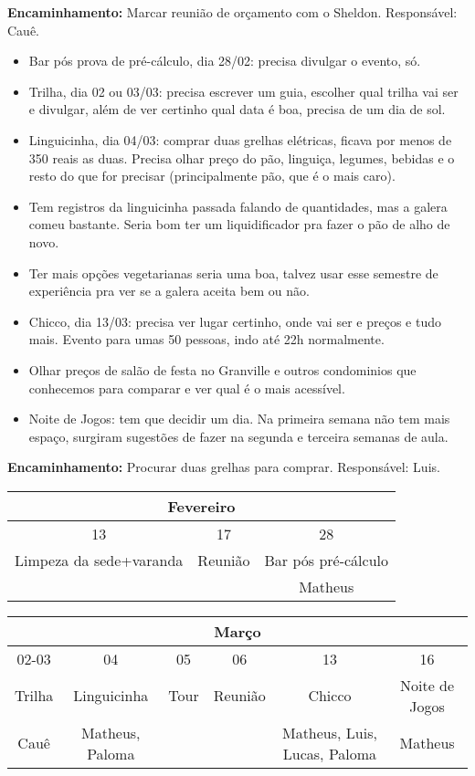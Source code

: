 \documentclass{ata-calico}
\begin{document}
\textbf{Encaminhamento:} Marcar reunião de orçamento com o Sheldon. Responsável: Cauê.

\begin{itemize}
\item Bar pós prova de pré-cálculo, dia 28/02: precisa divulgar o evento, só.
\item Trilha, dia 02 ou 03/03: precisa escrever um guia, escolher qual trilha vai ser e divulgar, além de ver certinho qual data é boa, precisa de um dia de sol.
\item Linguicinha, dia 04/03: comprar duas grelhas elétricas, ficava por menos de 350 reais as duas. Precisa olhar preço do pão, linguiça, legumes, bebidas e o resto do que for precisar (principalmente pão, que é o mais caro).
\item Tem registros da linguicinha passada falando de quantidades, mas a galera comeu bastante. Seria bom ter um liquidificador pra fazer o pão de alho de novo.
\item Ter mais opções vegetarianas seria uma boa, talvez usar esse semestre de experiência pra ver se a galera aceita bem ou não.
\item Chicco, dia 13/03: precisa ver lugar certinho, onde vai ser e preços e tudo mais. Evento para umas 50 pessoas, indo até 22h normalmente.
\item Olhar preços de salão de festa no Granville e outros condominios que conhecemos para comparar e ver qual é o mais acessível.
\item Noite de Jogos: tem que decidir um dia. Na primeira semana não tem mais espaço, surgiram sugestões de fazer na segunda e terceira semanas de aula.
\end{itemize}

\textbf{Encaminhamento:} Procurar duas grelhas para comprar. Responsável: Luis.

\begin{center}
\begin{tabular}{|c|c|c|} \hline
    \multicolumn{3}{|c|}{Fevereiro} \\ \hline
    13 & 17 & 28 \\ \hline
    Limpeza da sede+varanda & Reunião & Bar pós pré-cálculo \\ \hline
    & & Matheus \\ \hline
\end{tabular}

\vspace{.5cm}
\begin{tabular}{|c|c|c|c|c|c|} \hline
     \multicolumn{6}{|c|}{Março} \\ \hline
     02-03 & 04 & 05 & 06 & 13 & 16 \\ \hline
     Trilha & Linguicinha & Tour & Reunião & Chicco & Noite de Jogos \\ \hline
     Cauê & Matheus, Paloma & & & Matheus, Luis, Lucas, Paloma & Matheus \\ \hline
\end{tabular}
\end{center}

\end{document}

